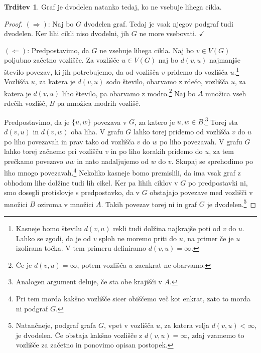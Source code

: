 \documentclass[11pt]{book}
\def\kljuka{$\checkmark$}
\theoremstyle{definition}
\theoremstyle{zgled}
\theoremstyle{odprtproblem}
\theoremstyle{domacanaloga}
\newenvironment{dokaz}
    {\color{siva}\begin{proof}}
    {\end{proof}}
\theoremstyle{izrek}
\newtheorem*{trditev}{Trditev}
\begin{document}
\begin{trditev}
Graf je dvodelen natanko tedaj, ko ne vsebuje lihega cikla.
\end{trditev}
\begin{dokaz}
$(\Rightarrow)$: Naj bo $G$ dvodelen graf. Tedaj je vsak njegov podgraf tudi dvodelen. Ker lihi cikli niso dvodelni, jih $G$ ne more vsebovati. \kljuka

$(\Leftarrow)$: Predpostavimo, da $G$ ne vsebuje lihega cikla. Naj bo $v \in V(G)$ poljubno začetno vozlišče. Za vozlišče $u \in V(G)$ naj bo $d(v,u)$ najmanjše število povezav, ki jih potrebujemo, da od vozlišča $v$ pridemo do vozlišča $u$.\footnote{Kasneje bomo številu $d(v,u)$ rekli tudi dolžina najkrajše poti od $v$ do $u$. Lahko se zgodi, da je od $v$ sploh ne moremo priti do $u$, na primer če je $u$ izolirana točka. V tem primeru definiramo $d(v,u) = \infty$.} Vozlišča $u$, za katera je $d(v,u)$ sodo število, obarvamo z rdečo, vozlišča $u$, za katera je $d(v,u)$ liho število, pa obarvamo z modro.\footnote{Če je $d(v,u) = \infty$, potem vozlišča $u$ zaenkrat ne obarvamo.} Naj bo $A$ množica vseh rdečih vozlišč, $B$ pa množica modrih vozlišč.

Predpostavimo, da je $\{ u, w \}$ povezava v $G$, za katero je $u, w \in B$.\footnote{Analogen argument deluje, če sta obe krajišči v $A$.} Torej sta $d(v,u)$ in $d(v,w)$ oba liha. V grafu $G$ lahko torej pridemo od vozlišča $v$ do $u$ po liho povezavah in prav tako od vozlišča $v$ do $w$ po liho povezavah. V grafu $G$ lahko torej začnemo pri vozlišču $v$ in po liho korakih pridemo do $u$, za tem prečkamo povezavo $uw$ in nato nadaljujemo od $w$ do $v$. Skupaj se sprehodimo po liho mnogo povezavah.\footnote{Pri tem morda kakšno vozlišče sicer obiščemo več kot enkrat, zato to morda ni podgraf $G$.} Nekoliko kasneje bomo premislili, da ima vsak graf z obhodom lihe dolžine tudi lih cikel. Ker pa lihih ciklov v $G$ po predpostavki ni, smo dosegli protislovje s predpostavko, da v $G$ obstajajo povezave med vozlišči v množici $B$ oziroma v množici $A$. Takih povezav torej ni in graf $G$ je dvodelen.\footnote{Natančneje, podgraf grafa $G$, vpet v vozlišča $u$, za katera velja $d(v,u) < \infty$, je dvodelen. Če obstaja kakšno vozlišče z $d(v,u) = \infty$, zdaj vzamemo to vozlišče za začetno in ponovimo opisan postopek.}
\end{dokaz}
\end{document}
